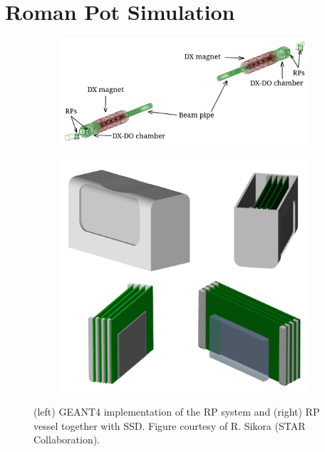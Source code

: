 \section{Roman Pot Simulation}\label{section:reconstructionSTAR_pp2pp_Sim}
\begin{figure}[h!]
	\centering
	\begin{subfigure}{.64\textwidth}
		\includegraphics[width=\textwidth]{chapters/dataSampleSTAR/img/pp2ppSim/geant4plot.png}
	\end{subfigure}
	\begin{subfigure}{.34\textwidth}
		\includegraphics[width=\textwidth]{chapters/dataSampleSTAR/img/pp2ppSim/g4Rp.png}
	\end{subfigure}	
	
	\caption{(left) GEANT4 implementation of the RP system and (right) RP vessel together with SSD. Figure courtesy of R. Sikora (STAR Collaboration).}
	\label{fig:pp2ppSim}
\end{figure}

